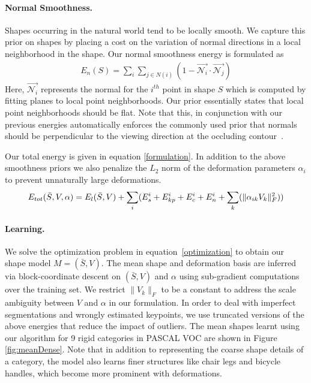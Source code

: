\paragraph{Normal Smoothness.} Shapes occurring in the natural world tend to be locally smooth. We capture this prior on shapes by placing a cost on the variation of normal directions in a local neighborhood in the shape. Our normal smoothness energy is formulated as
\begin{gather}
 \label{eq:normal_con}E_{n}(S)=\underset{i}{\sum}\underset{j\in N(i)}{\sum}(1-\vec{\mathcal{N}_i} \cdot \vec{\mathcal{N}_j})
\end{gather}
 Here, $\vec{\mathcal{N}_i}$ represents the normal for the $i^{th}$ point in shape $S$ which is computed by fitting planes to local point neighborhoods. Our prior essentially states that local point neighborhoods should be flat. Note that this, in conjunction with our previous energies automatically enforces the commonly used prior that normals should be perpendicular to the viewing direction at the occluding contour~\cite{Barron2012B}.

Our total energy is given in equation \eqref{formulation}. In addition to the above smoothness priors we also penalize the $L_2$ norm of the deformation parameters $\alpha_i$ to prevent unnaturally large deformations.
\begin{gather}
\eqlabel{formulation}
E_{tot}(\bar{S},V,\alpha) = E_{l}(\bar{S},V)+\underset{i}{\sum}(E_{s}^i+E_{kp}^i+E_{c}^i+E_{n}^i+\underset{k}{\sum}(\|\alpha_{ik}V_k\|_F^{2}))
\end{gather}


\paragraph{Learning.} We solve the optimization problem in equation~\eqref{optimization} to obtain our shape model $M=(\bar{S},V)$. The mean shape and deformation basis are inferred via block-coordinate descent on $(\bar{S},V)$ and $\alpha$ using sub-gradient computations over the training set. We restrict $\|V_k\|_F$ to be a constant to address the scale ambiguity between $V$ and $\alpha$ in our formulation. In order to deal with imperfect segmentations and wrongly estimated keypoints, we use truncated versions of the above energies that reduce the impact of outliers. The mean shapes learnt using our algorithm for 9 rigid categories in PASCAL VOC are shown in Figure \ref{fig:meanDense}. Note that in addition to representing the coarse shape details of a category, the model also learns finer structures like chair legs and bicycle handles, which become more prominent with deformations.

